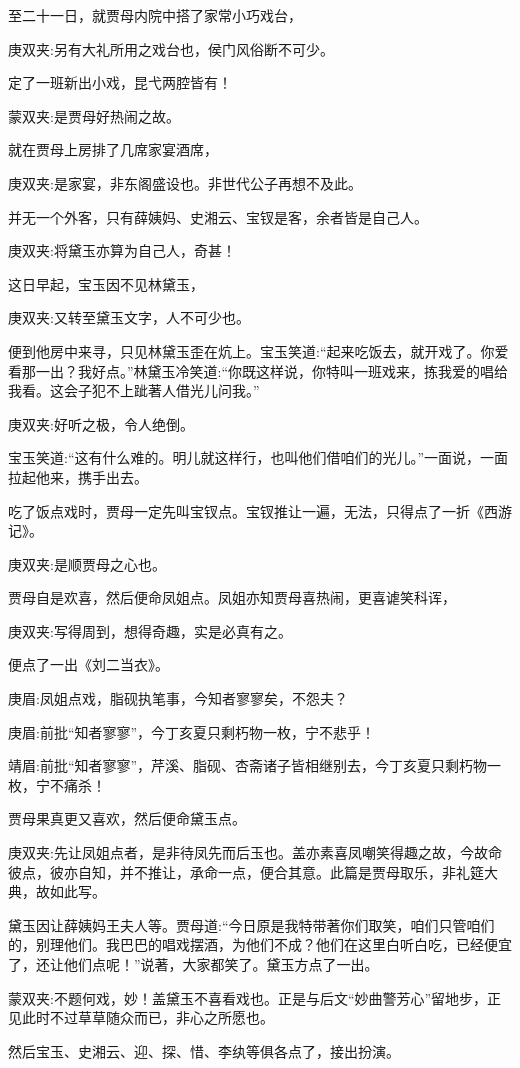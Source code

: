 \begin{parag}
    至二十一日，就贾母内院中搭了家常小巧戏台，\begin{note}庚双夹:另有大礼所用之戏台也，侯门风俗断不可少。\end{note}定了一班新出小戏，昆弋两腔皆有！\begin{note}蒙双夹:是贾母好热闹之故。\end{note}就在贾母上房排了几席家宴酒席，\begin{note}庚双夹:是家宴，非东阁盛设也。非世代公子再想不及此。\end{note}并无一个外客，只有薛姨妈、史湘云、宝钗是客，余者皆是自己人。\begin{note}庚双夹:将黛玉亦算为自己人，奇甚！\end{note}这日早起，宝玉因不见林黛玉，\begin{note}庚双夹:又转至黛玉文字，人不可少也。\end{note}便到他房中来寻，只见林黛玉歪在炕上。宝玉笑道:“起来吃饭去，就开戏了。你爱看那一出？我好点。”林黛玉冷笑道:“你既这样说，你特叫一班戏来，拣我爱的唱给我看。这会子犯不上跐著人借光儿问我。”\begin{note}庚双夹:好听之极，令人绝倒。\end{note}宝玉笑道:“这有什么难的。明儿就这样行，也叫他们借咱们的光儿。”一面说，一面拉起他来，携手出去。
\end{parag}


\begin{parag}
    吃了饭点戏时，贾母一定先叫宝钗点。宝钗推让一遍，无法，只得点了一折《西游记》。\begin{note}庚双夹:是顺贾母之心也。\end{note}贾母自是欢喜，然后便命凤姐点。凤姐亦知贾母喜热闹，更喜谑笑科诨，\begin{note}庚双夹:写得周到，想得奇趣，实是必真有之。\end{note}便点了一出《刘二当衣》。\begin{note}庚眉:凤姐点戏，脂砚执笔事，今知者寥寥矣，不怨夫？\end{note}\begin{note}庚眉:前批“知者寥寥”，今丁亥夏只剩朽物一枚，宁不悲乎！\end{note}\begin{note}靖眉:前批“知者寥寥”，芹溪、脂砚、杏斋诸子皆相继别去，今丁亥夏只剩朽物一枚，宁不痛杀！\end{note}贾母果真更又喜欢，然后便命黛玉点。\begin{note}庚双夹:先让凤姐点者，是非待凤先而后玉也。盖亦素喜凤嘲笑得趣之故，今故命彼点，彼亦自知，并不推让，承命一点，便合其意。此篇是贾母取乐，非礼筵大典，故如此写。\end{note}黛玉因让薛姨妈王夫人等。贾母道:“今日原是我特带著你们取笑，咱们只管咱们的，别理他们。我巴巴的唱戏摆酒，为他们不成？他们在这里白听白吃，已经便宜了，还让他们点呢！”说著，大家都笑了。黛玉方点了一出。\begin{note}蒙双夹:不题何戏，妙！盖黛玉不喜看戏也。正是与后文“妙曲警芳心”留地步，正见此时不过草草随众而已，非心之所愿也。\end{note}然后宝玉、史湘云、迎、探、惜、李纨等俱各点了，接出扮演。
\end{parag}


